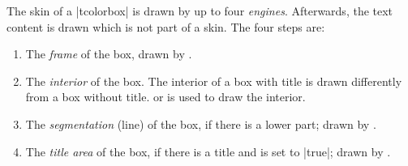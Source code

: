 The skin of a |tcolorbox| is drawn by up to four \emph{engines}.
Afterwards, the text content is drawn which is not part of a skin.
The four steps are:
\begin{enumerate}
\item The \emph{frame} of the box, drawn by .
\item The \emph{interior} of the box. The interior of a box with title is
  drawn differently from a box without title.
   or 
  is used to draw the interior.
\item The \emph{segmentation} (line) of the box, if there is a lower part;
  drawn by .
\item The \emph{title area} of the box, if there is a title and
   is set to |true|; drawn
  by .
\end{enumerate}


